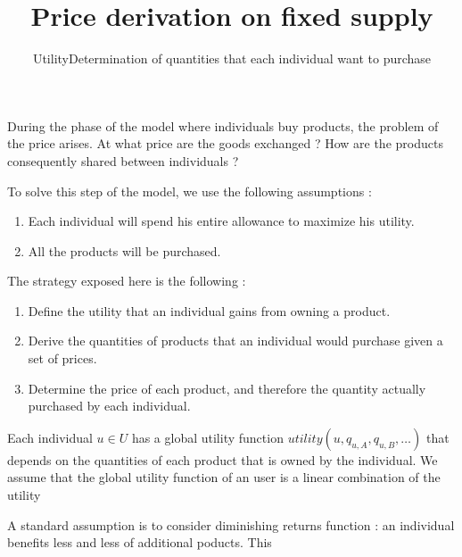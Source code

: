\title{Price derivation on fixed supply}

During the phase of the model where individuals buy products, the problem of the price arises.
At what price are the goods exchanged ?
How are the products consequently shared between individuals ?

To solve this step of the model, we use the following assumptions :
\begin{enumerate}
    \item Each individual will spend his entire allowance to maximize his utility.
    \item All the products will be purchased.
\end{enumerate}

The strategy exposed here is the following :
\begin{enumerate}
    \item Define the utility that an individual gains from owning a product.
    \item Derive the quantities of products that an individual would purchase given a set of prices.
    \item Determine the price of each product, and therefore the quantity actually purchased by each individual.
\end{enumerate}

\subtitle{Utility}
Each individual $u\in U$ has a global utility function $utility(u, q_{u, A}, q_{u, B}, \dots)$ that depends on the quantities of each product that is owned by the individual.
We assume that the global utility function of an user  is a linear combination of the utility

A standard assumption is to consider diminishing returns function : an individual benefits less and less of additional poducts.
This 

\subtitle{Determination of quantities that each individual want to purchase}
